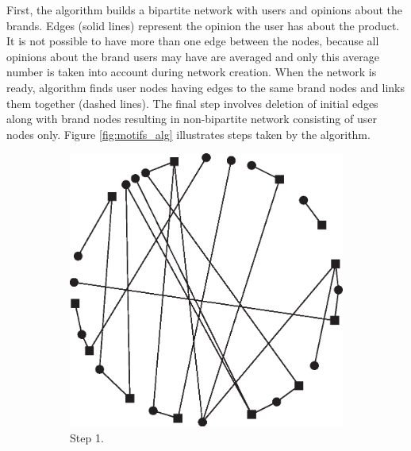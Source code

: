       First, the algorithm builds a bipartite network with users and opinions about the brands. Edges (solid lines) represent the opinion the user has about the product. It is not possible to have more than one edge between the nodes, because all opinions about the brand users may have are averaged and only this average number is taken into account during network creation. When the network is ready, algorithm finds user nodes having edges to the same brand nodes and links them together (dashed lines). The final step involves deletion of initial edges along with brand nodes resulting in non-bipartite network consisting of user nodes only. Figure \ref{fig:motifs_alg} illustrates steps taken by the algorithm.
      \begin{figure}[h]
        \centering
        \begin{subfigure}[b]{0.3\textwidth}
          \includegraphics[width=\textwidth]{chapters/03_implementation/cs_motif_1}
          \caption{Step 1.}
          \label{fig:motifs_alg_1}
        \end{subfigure}
        \quad
        \begin{subfigure}[b]{0.3\textwidth}

\end{subfigure}
\end{figure}
